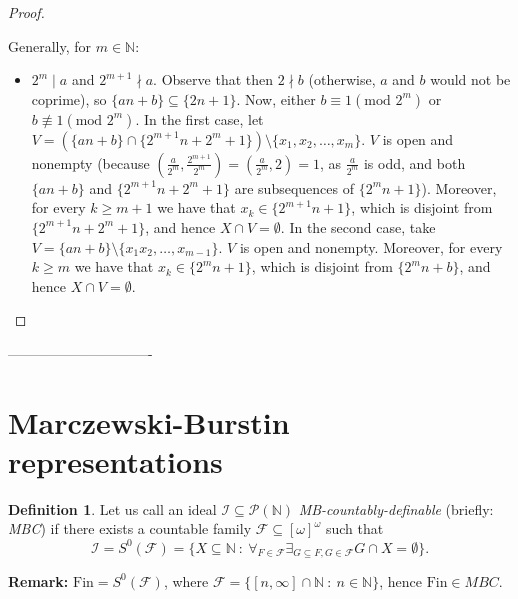 \documentclass{amsart}
\theoremstyle{definition}
\newtheorem{df}{Definition}
\theoremstyle{definition}
\newcommand{\N}{{\mathbb N}}
\newcommand{\Fin}{\textrm{Fin}}
\newcommand{\I}{\mathcal I}
\newcommand{\J}{\mathcal J}
\newcommand{\MB}{S^0}  %
\begin{document}
\begin{proof}
\begin{itemize}
\end{itemize}
Generally, for $m\in\N$:
\begin{itemize}
 \item $2^m\mid a$ and $2^{m+1}\nmid a$. Observe that then $2 \nmid b$ (otherwise, $a$ and $b$ would not be coprime), so $\{an+b\}\subseteq \{2n+1\}$. Now, either $b\equiv 1 (\textrm{mod } 2^m)$ or $b \not\equiv 1 (\textrm{mod } 2^m)$. In the first case, let $V = (\{an+b\} \cap \{2^{m+1}n+2^m+1\})\setminus\{x_1, x_2,\ldots, x_m\}$. $V$ is open and nonempty (because $(\frac{a}{2^m},\frac{2^{m+1}}{2^m})=(\frac{a}{2^m},2)=1$, as $\frac{a}{2^m}$ is odd, and both $\{an+b\}$ and $\{2^{m+1}n+2^m+1\}$ are subsequences of $\{2^m n+1\}$). Moreover, for every $k\geq m+1$ we have that $x_k\in \{2^{m+1}n+1\}$, which is disjoint from $\{2^{m+1}n+2^m+1\}$, and hence $X\cap V = \emptyset$. In the second case, take $V = \{an+b\} \setminus\{x_1x_2,\ldots, x_{m-1}\}$. $V$ is open and nonempty. Moreover, for every $k\geq m$ we have that $x_k\in \{2^m n+1\}$, which is disjoint from $\{2^m n+b\}$, and hence $X\cap V = \emptyset$.
\end{itemize}
\end{proof}

-------------------------------




\color{black}
\section{Marczewski-Burstin representations}

\begin{df}
Let us call an ideal $\I\subseteq \mathcal{P}(\N)$ 
\emph{MB-countably-definable}
(briefly: \emph{MBC}) if there exists 
a countable family $\mathcal{F}\subseteq [\omega]^\omega$
such that
$$\I = \MB(\mathcal{F}) = \{X\subseteq\N\ :\ \forall_{F\in\mathcal{F}} \exists_{G\subseteq F, G\in\mathcal{F}} G\cap X=\emptyset\}.$$
\end{df}
\textbf{Remark:} $\Fin = \MB(\mathcal{F})$, where $\mathcal{F}= \{[n, \infty]\cap\N\ :\ n\in\N\}$, 
hence $\Fin\in MBC$.\\
		
\end{document}

